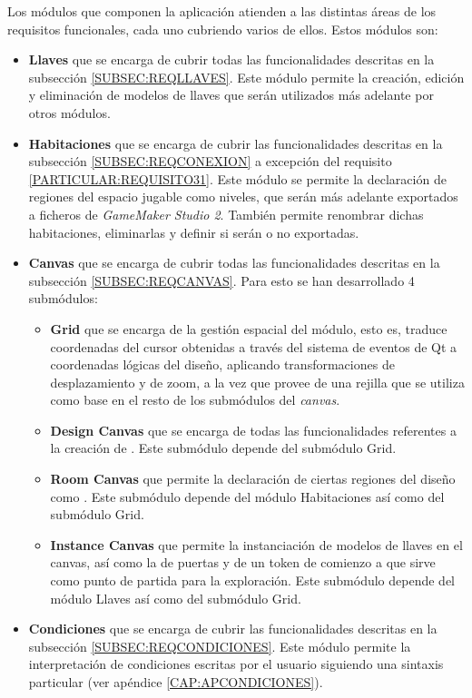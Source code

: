 Los módulos que componen la aplicación atienden a las distintas áreas de los requisitos funcionales, cada uno cubriendo varios de ellos. Estos módulos son:
\begin{itemize}
	\item \textbf{Llaves} que se encarga de cubrir todas las funcionalidades descritas en la subsección \ref{SUBSEC:REQLLAVES}. Este módulo permite la creación, edición y eliminación de modelos de llaves que serán utilizados más adelante por otros módulos.
	\item \textbf{Habitaciones} que se encarga de cubrir las funcionalidades descritas en la subsección \ref{SUBSEC:REQCONEXION} a excepción del requisito \ref{PARTICULAR:REQUISITO31}. Este módulo se permite la declaración de regiones del espacio jugable como niveles, que serán más adelante exportados a ficheros de \textit{GameMaker Studio 2}. También permite renombrar dichas habitaciones, eliminarlas y definir si serán o no exportadas.
	\item \textbf{Canvas} que se encarga de cubrir todas las funcionalidades descritas en la subsección \ref{SUBSEC:REQCANVAS}. Para esto se han desarrollado 4 submódulos:
	\begin{itemize}
		\item \textbf{Grid} que se encarga de la gestión espacial del módulo, esto es, traduce coordenadas del cursor obtenidas a través del sistema de eventos de Qt a coordenadas lógicas del diseño, aplicando transformaciones de desplazamiento y de zoom, a la vez que provee de una rejilla que se utiliza como base en el resto de los submódulos del \textit{canvas}.
		\item \textbf{Design Canvas} que se encarga de todas las funcionalidades referentes a la creación de . Este submódulo depende del submódulo Grid.
		\item \textbf{Room Canvas} que permite la declaración de ciertas regiones del diseño como . Este submódulo depende del módulo Habitaciones así como del submódulo Grid.
		\item \textbf{Instance Canvas} que permite la instanciación de modelos de llaves en el canvas, así como la de puertas y de un token de comienzo a que sirve como punto de partida para la exploración. Este submódulo depende del módulo Llaves así como del submódulo Grid.
	\end{itemize}
	\item \textbf{Condiciones} que se encarga de cubrir las funcionalidades descritas en la subsección \ref{SUBSEC:REQCONDICIONES}. Este módulo permite la interpretación de condiciones escritas por el usuario siguiendo una sintaxis particular (ver apéndice \ref{CAP:APCONDICIONES}).

\end{itemize}
